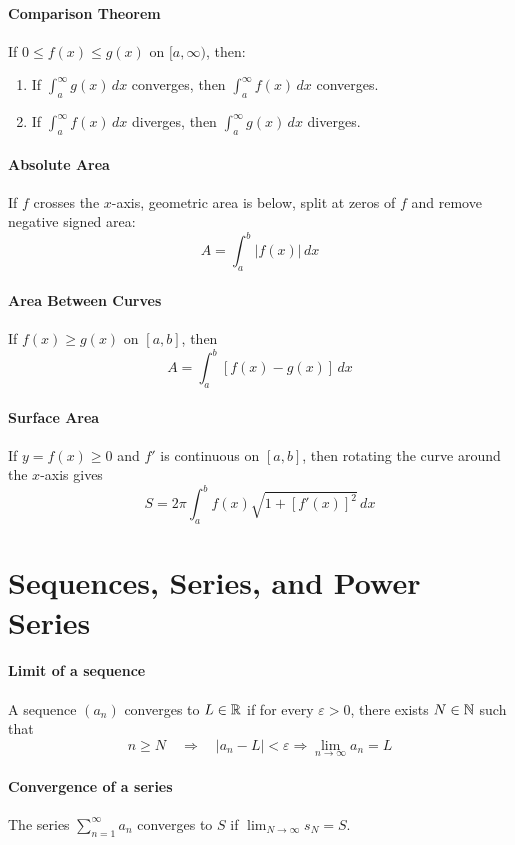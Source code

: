 \documentclass[oneside]{book}
\begin{document}
\paragraph{Comparison Theorem}{
If $0\le f(x)\le g(x)$ on $[a,\infty)$, then:
\begin{enumerate}
    \item If $\int_a^\infty g(x)\,dx$ converges, then $\int_a^\infty f(x)\,dx$ converges.
    \item If $\int_a^\infty f(x)\,dx$ diverges, then $\int_a^\infty g(x)\,dx$ diverges.
\end{enumerate}
}

\paragraph{Absolute Area}
If $f$ crosses the $x$-axis, geometric area is below, split at zeros of $f$ and remove negative signed area:
\[
A=\int_a^b |f(x)|\,dx
\]

\paragraph{Area Between Curves}
If $f(x)\ge g(x)$ on $[a,b]$, then
\[
A=\int_a^b [f(x)-g(x)]\,dx
\]

\paragraph{Surface Area}
If $y=f(x)\ge0$ and $f'$ is continuous on $[a,b]$, then rotating the curve around the $x$-axis gives
\[
S=2\pi\int_a^b f(x)\sqrt{1+[f'(x)]^2}\,dx
\]


\section{Sequences, Series, and Power Series}

\paragraph{Limit of a sequence}
A sequence $(a_n)$ converges to $L\in\mathbb{R}$ if for every $\varepsilon>0$, there exists $N\in\mathbb{N}$ such that
\[
    n\geq N \quad \Longrightarrow \quad |a_n-L|<\varepsilon \Longrightarrow \lim_{n\to\infty}a_n=L
\]


\paragraph{Convergence of a series}
The series $\sum_{n=1}^{\infty}a_n$ converges to $S$ if $\lim_{N\to\infty}s_N=S$. 
\end{document}
